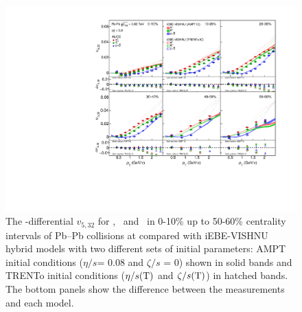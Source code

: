 \begin{figure}[h]
\begin{center}
\includegraphics[scale=0.73]{figures/model/TrentoAndAMPT_v523_gap00_PID2.pdf}
\end{center}
\caption{The \pT-differential $v_{5,32}$ for \pion, \kaon~and \proton~in 0-10\% up to 50-60\% centrality intervals of Pb--Pb collisions at \sNN compared with iEBE-VISHNU hybrid models with two different sets of initial parameters: AMPT initial conditions ($\eta/s$= 0.08 and $\zeta/s$ = 0) shown in solid bands and TRENTo initial conditions ($\eta/s({\rm T})$ and $\zeta/s({\rm T})$) in hatched bands. The bottom panels show the difference between the measurements and each model.}
\label{v523_model}
\end{figure}


